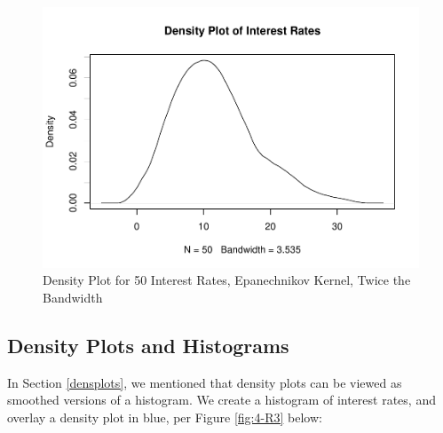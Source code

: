 \documentclass[
]{book}
\newenvironment{Shaded}{\begin{snugshade}}{\end{snugshade}}
\newcommand{\AttributeTok}[1]{\textcolor[rgb]{0.13,0.29,0.53}{#1}}
\newcommand{\ConstantTok}[1]{\textcolor[rgb]{0.56,0.35,0.01}{#1}}
\newcommand{\DocumentationTok}[1]{\textcolor[rgb]{0.56,0.35,0.01}{\textbf{\textit{#1}}}}
\newcommand{\FunctionTok}[1]{\textcolor[rgb]{0.13,0.29,0.53}{\textbf{#1}}}
\newcommand{\NormalTok}[1]{#1}
\newcommand{\SpecialCharTok}[1]{\textcolor[rgb]{0.81,0.36,0.00}{\textbf{#1}}}
\newcommand{\StringTok}[1]{\textcolor[rgb]{0.31,0.60,0.02}{#1}}
\begin{document}
\begin{figure}
\centering
\includegraphics{bookdown-demo_files/figure-latex/4-R2-1.pdf}
\caption{\label{fig:4-R2}Density Plot for 50 Interest Rates, Epanechnikov Kernel, Twice the Bandwidth}
\end{figure}

\subsection{Density Plots and Histograms}\label{density-plots-and-histograms}

In Section \ref{densplots}, we mentioned that density plots can be viewed as smoothed versions of a histogram. We create a histogram of interest rates, and overlay a density plot in blue, per Figure \ref{fig:4-R3} below:

\begin{Shaded}
\end{Shaded}
\end{document}
